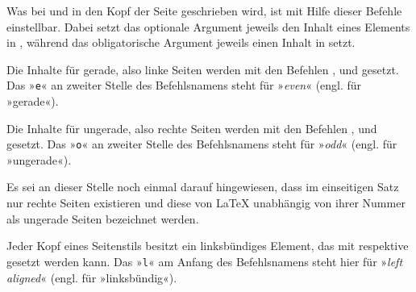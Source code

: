 \begin{Declaration}
\end{Declaration}
\iffalse%
Was in den Kopf der Seitenstile
\DescRef{\LabelBase.pagestyle.plain.scrheadings} und
\DescRef{\LabelBase.pagestyle.scrheadings} %
\else%
Was bei  und
 in den Kopf der Seite %
\fi%
geschrieben wird, ist mit Hilfe dieser Befehle einstellbar. Dabei setzt das
optionale Argument jeweils den Inhalt eines Elements in
%
\iffalse%
\iffree{}{ beziehungsweise \PageStyle{scrplain}} \fi , während das
obligatorische Argument jeweils einen Inhalt in
 setzt.

Die Inhalte für gerade, also linke Seiten werden mit den
Befehlen ,  und  gesetzt. Das
»\texttt{e}« an zweiter Stelle des Befehlsnamens steht %
\iffalse dabei \fi %
für »\emph{even}« (engl. für »gerade«).

Die Inhalte für ungerade, also rechte Seiten werden mit
den Befehlen ,  und  gesetzt. Das
»\texttt{o}« an zweiter Stelle des Befehlsnamens steht %
\iffalse dabei \fi %
für »\emph{odd}« (engl. für »ungerade«).

Es sei an dieser Stelle noch einmal darauf hingewiesen,
dass im einseitigen Satz nur rechte Seiten existieren und diese von \LaTeX{}
unabhängig von ihrer Nummer als ungerade Seiten bezeichnet werden.

Jeder Kopf eines Seitenstils besitzt ein linksbündiges
Element, das mit  respektive  gesetzt werden
kann. Das »\texttt{l}« am Anfang des Befehlsnamens steht hier für »\emph{left
  aligned}« (engl. für »linksbündig«).

